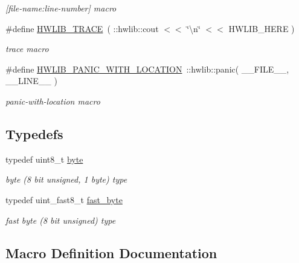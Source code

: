 \begin{DoxyCompactItemize}
\begin{DoxyCompactList}\small\item\em \mbox{[}file-\/name\+:line-\/number\mbox{]} macro \end{DoxyCompactList}\item 
\#define \hyperlink{hwlib-defines_8hpp_a536d8e892418f0e4127db75a6f653add}{H\+W\+L\+I\+B\+\_\+\+T\+R\+A\+CE}~( \+::hwlib\+::cout $<$$<$ \char`\"{}\textbackslash{}n\char`\"{} $<$$<$ H\+W\+L\+I\+B\+\_\+\+H\+E\+RE )
\begin{DoxyCompactList}\small\item\em trace macro \end{DoxyCompactList}\item 
\#define \hyperlink{hwlib-defines_8hpp_a63e41f8f1231b208819549fe26a58440}{H\+W\+L\+I\+B\+\_\+\+P\+A\+N\+I\+C\+\_\+\+W\+I\+T\+H\+\_\+\+L\+O\+C\+A\+T\+I\+ON}~\+::hwlib\+::panic( \+\_\+\+\_\+\+F\+I\+L\+E\+\_\+\+\_\+, \+\_\+\+\_\+\+L\+I\+N\+E\+\_\+\+\_\+ )
\begin{DoxyCompactList}\small\item\em panic-\/with-\/location macro \end{DoxyCompactList}\end{DoxyCompactItemize}
\subsection*{Typedefs}
\begin{DoxyCompactItemize}
\item 
typedef uint8\+\_\+t \hyperlink{hwlib-defines_8hpp_ab8ef12fab634c171394422d0ee8baf94}{byte}
\begin{DoxyCompactList}\small\item\em byte (8 bit unsigned, 1 byte) type \end{DoxyCompactList}\item 
typedef uint\+\_\+fast8\+\_\+t \hyperlink{hwlib-defines_8hpp_a54998f25522db04b7b797b0fcc9eb3d5}{fast\+\_\+byte}
\begin{DoxyCompactList}\small\item\em fast byte (8 bit unsigned) type \end{DoxyCompactList}\end{DoxyCompactItemize}


\subsection{Macro Definition Documentation}
